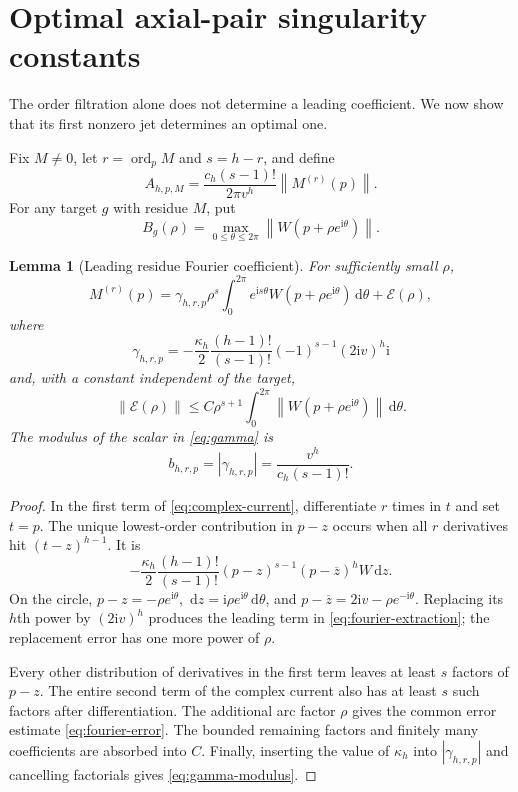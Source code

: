 \documentclass[11pt,a4paper]{article}
\numberwithin{equation}{section}
\newtheorem{lemma}[theorem]{Lemma}
\theoremstyle{definition}
\theoremstyle{remark}
\newcommand{\ii}{\mathrm i}
\newcommand{\ord}{\operatorname{ord}}
\newcommand{\dd}{\,\mathrm d}
\newcommand{\norm}[1]{\left\lVert#1\right\rVert}
\newcommand{\barz}{\overline z}
\begin{document}
\section{Optimal axial-pair singularity constants}
\label{sec:sharp}

The order filtration alone does not determine a leading coefficient. We now
show that its first nonzero jet determines an optimal one.

Fix $M\ne0$, let $r=\ord_pM$ and $s=h-r$, and define
\begin{equation}\label{eq:Aconstant}
 A_{h,p,M}=\frac{c_h(s-1)!}{2\pi v^h}\norm{M^{(r)}(p)}.
\end{equation}
For any target $g$ with residue $M$, put
\[
 B_g(\rho)=\max_{0\le\theta\le2\pi}
 \norm{W(p+\rho e^{\ii\theta})}.
\]

\begin{lemma}[Leading residue Fourier coefficient]\label{lem:fourier}
For sufficiently small $\rho$,
\begin{equation}\label{eq:fourier-extraction}
 M^{(r)}(p)=\gamma_{h,r,p}\rho^s
 \int_0^{2\pi}e^{\ii s\theta}W(p+\rho e^{\ii\theta})\dd\theta
 +\mathcal E(\rho),
\end{equation}
where
\begin{equation}\label{eq:gamma}
 \gamma_{h,r,p}=-\frac{\kappa_h}{2}
 \frac{(h-1)!}{(s-1)!}(-1)^{s-1}(2\ii v)^h\ii
\end{equation}
and, with a constant independent of the target,
\begin{equation}\label{eq:fourier-error}
 \norm{\mathcal E(\rho)}
 \le C\rho^{s+1}\int_0^{2\pi}
 \norm{W(p+\rho e^{\ii\theta})}\dd\theta.
\end{equation}
The modulus of the scalar in \eqref{eq:gamma} is
\begin{equation}\label{eq:gamma-modulus}
 b_{h,r,p}=|\gamma_{h,r,p}|=\frac{v^h}{c_h(s-1)!}.
\end{equation}
\end{lemma}

\begin{proof}
In the first term of \eqref{eq:complex-current}, differentiate $r$ times in
$t$ and set $t=p$. The unique lowest-order contribution in $p-z$ occurs when
all $r$ derivatives hit $(t-z)^{h-1}$. It is
\[
 -\frac{\kappa_h}{2}\frac{(h-1)!}{(s-1)!}
 (p-z)^{s-1}(p-\barz)^hW\dd z.
\]
On the circle, $p-z=-\rho e^{\ii\theta}$,
$\dd z=\ii\rho e^{\ii\theta}\dd\theta$, and
$p-\barz=2\ii v-\rho e^{-\ii\theta}$. Replacing its $h$th power by
$(2\ii v)^h$ produces the leading term in \eqref{eq:fourier-extraction};
the replacement error has one more power of $\rho$.

Every other distribution of derivatives in the first term leaves at least
$s$ factors of $p-z$. The entire second term of the complex current also
has at least $s$ such factors after differentiation. The additional arc
factor $\rho$ gives the common error estimate \eqref{eq:fourier-error}.
The bounded remaining factors and finitely many coefficients are absorbed
into $C$. Finally, inserting the value of $\kappa_h$ into
$|\gamma_{h,r,p}|$ and cancelling factorials gives \eqref{eq:gamma-modulus}.
\end{proof}
\end{document}
